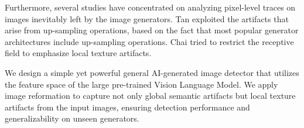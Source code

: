 Furthermore, several studies have concentrated on analyzing pixel-level traces on images inevitably left by the image generators. 
Tan \etal\cite{tan2024rethinking} exploited the artifacts that arise from up-sampling operations, based on the fact that most popular generator architectures include up-sampling operations. 
Chai \etal\cite{chai2020makes} tried to restrict the receptive field to emphasize local texture artifacts.

We design a simple yet powerful general AI-generated image detector that utilizes the feature space of the large pre-trained Vision Language Model.
We apply image reformation to capture not only global semantic artifacts but local texture artifacts from the input images, ensuring detection performance and generalizability on unseen generators.
